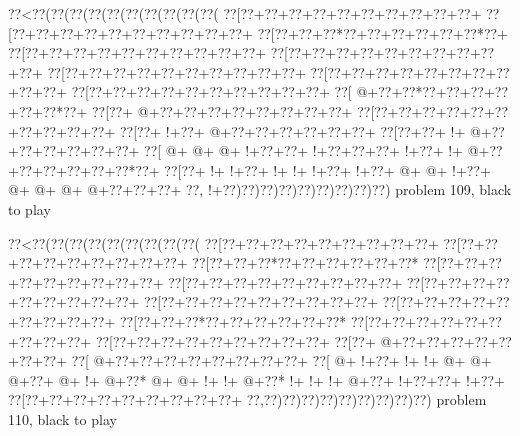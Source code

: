 \vbox{\vbox{\goo
\0??<\0??(\0??(\0??(\0??(\0??(\0??(\0??(\0??(\0??(\0??(
\0??[\0??+\0??+\0??+\0??+\0??+\0??+\0??+\0??+\0??+\0??+
\0??[\0??+\0??+\0??+\0??+\0??+\0??+\0??+\0??+\0??+\0??+
\0??[\0??+\0??+\0??*\0??+\0??+\0??+\0??+\0??+\0??*\0??+
\0??[\0??+\0??+\0??+\0??+\0??+\0??+\0??+\0??+\0??+\0??+
\0??[\0??+\0??+\0??+\0??+\0??+\0??+\0??+\0??+\0??+\0??+
\0??[\0??+\0??+\0??+\0??+\0??+\0??+\0??+\0??+\0??+\0??+
\0??[\0??+\0??+\0??+\0??+\0??+\0??+\0??+\0??+\0??+\0??+
\0??[\0??+\0??+\0??+\0??+\0??+\0??+\0??+\0??+\0??+\0??+
\0??[\- @+\0??+\0??*\0??+\0??+\0??+\0??+\0??+\0??*\0??+
\0??[\0??+\- @+\0??+\0??+\0??+\0??+\0??+\0??+\0??+\0??+
\0??[\0??+\0??+\0??+\0??+\0??+\0??+\0??+\0??+\0??+\0??+
\0??[\0??+\- !+\0??+\- @+\0??+\0??+\0??+\0??+\0??+\0??+
\0??[\0??+\0??+\- !+\- @+\0??+\0??+\0??+\0??+\0??+\0??+
\0??[\- @+\- @+\- @+\- !+\0??+\0??+\- !+\0??+\0??+\0??+
\- !+\0??+\- !+\- @+\0??+\0??+\0??+\0??+\0??+\0??*\0??+
\0??[\0??+\- !+\- !+\0??+\- !+\- !+\- !+\0??+\- !+\0??+
\- @+\- @+\- !+\0??+\- @+\- @+\- @+\- @+\0??+\0??+\0??+
\0??,\- !+\0??)\0??)\0??)\0??)\0??)\0??)\0??)\0??)\0??)
}
\hfil problem 109, black to play\hfil\break
}

\vbox{\vbox{\goo
\0??<\0??(\0??(\0??(\0??(\0??(\0??(\0??(\0??(\0??(
\0??[\0??+\0??+\0??+\0??+\0??+\0??+\0??+\0??+\0??+
\0??[\0??+\0??+\0??+\0??+\0??+\0??+\0??+\0??+\0??+
\0??[\0??+\0??+\0??*\0??+\0??+\0??+\0??+\0??+\0??*
\0??[\0??+\0??+\0??+\0??+\0??+\0??+\0??+\0??+\0??+
\0??[\0??+\0??+\0??+\0??+\0??+\0??+\0??+\0??+\0??+
\0??[\0??+\0??+\0??+\0??+\0??+\0??+\0??+\0??+\0??+
\0??[\0??+\0??+\0??+\0??+\0??+\0??+\0??+\0??+\0??+
\0??[\0??+\0??+\0??+\0??+\0??+\0??+\0??+\0??+\0??+
\0??[\0??+\0??+\0??*\0??+\0??+\0??+\0??+\0??+\0??*
\0??[\0??+\0??+\0??+\0??+\0??+\0??+\0??+\0??+\0??+
\0??[\0??+\0??+\0??+\0??+\0??+\0??+\0??+\0??+\0??+
\0??[\0??+\- @+\0??+\0??+\0??+\0??+\0??+\0??+\0??+
\0??[\- @+\0??+\0??+\0??+\0??+\0??+\0??+\0??+\0??+
\0??[\- @+\- !+\0??+\- !+\- !+\- @+\- @+\- @+\0??+
\- @+\- !+\- @+\0??*\- @+\- @+\- !+\- !+\- @+\0??*
\- !+\- !+\- !+\- @+\0??+\- !+\0??+\0??+\- !+\0??+
\0??[\0??+\0??+\0??+\0??+\0??+\0??+\0??+\0??+\0??+
\0??,\0??)\0??)\0??)\0??)\0??)\0??)\0??)\0??)\0??)
}
\hfil problem 110, black to play\hfil\break
}

